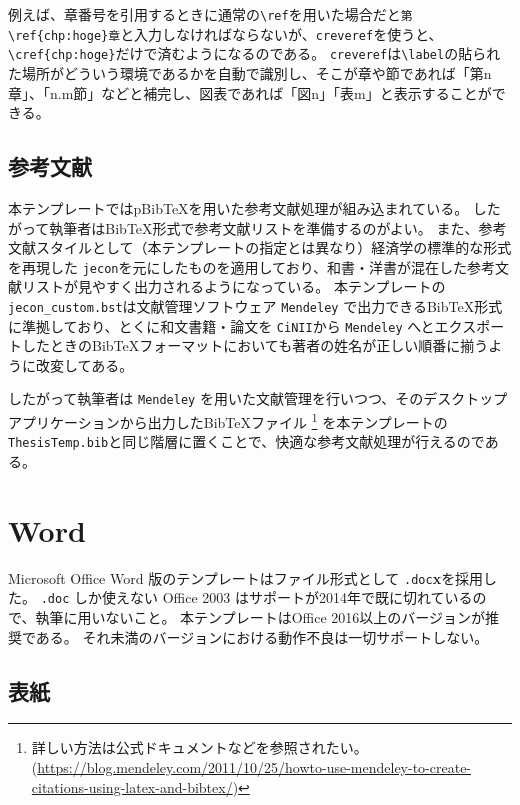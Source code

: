 				例えば、章番号を引用するときに通常の\verb|\ref|を用いた場合だと\verb|第\ref{chp:hoge}章|と入力しなければならないが、\texttt{creveref}を使うと、\verb|\cref{chp:hoge}|だけで済むようになるのである。
				\texttt{creveref}は\verb|\label|の貼られた場所がどういう環境であるかを自動で識別し、そこが章や節であれば「第n章」、「n.m節」などと補完し、図表であれば「図n」「表m」と表示することができる。


			\subsection{参考文献}
				\label{sub:bibtex}

				本テンプレートではpBibTeXを用いた参考文献処理が組み込まれている。
				したがって執筆者はBibTeX形式で参考文献リストを準備するのがよい。
				また、参考文献スタイルとして（本テンプレートの指定とは異なり）経済学の標準的な形式を再現した \texttt{jecon}を元にしたものを適用しており、和書・洋書が混在した参考文献リストが見やすく出力されるようになっている。
				本テンプレートの\texttt{jecon\_custom.bst}は文献管理ソフトウェア \texttt{Mendeley} で出力できるBibTeX形式に準拠しており、とくに和文書籍・論文を \texttt{CiNII}から \texttt{Mendeley} へとエクスポートしたときのBibTeXフォーマットにおいても著者の姓名が正しい順番に揃うように改変してある。

				したがって執筆者は \texttt{Mendeley} を用いた文献管理を行いつつ、そのデスクトップアプリケーションから出力したBibTeXファイル
				\footnote{詳しい方法は公式ドキュメントなどを参照されたい。(\url{https://blog.mendeley.com/2011/10/25/howto-use-mendeley-to-create-citations-using-latex-and-bibtex/})}
				を本テンプレートの\texttt{ThesisTemp.bib}と同じ階層に置くことで、快適な参考文献処理が行えるのである。

	\section{Word}
		\label{word}

		Microsoft Office Word 版のテンプレートはファイル形式として \texttt{.doc}\textbf{x}を採用した。
		\texttt{.doc} しか使えない Office 2003 はサポートが2014年で既に切れているので、執筆に用いないこと。
		本テンプレートはOffice 2016以上のバージョンが推奨である。
		それ未満のバージョンにおける動作不良は一切サポートしない。

		\subsection{表紙}
			\label{sub:titlepage_w}

